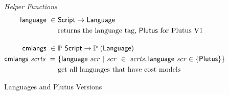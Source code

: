 \begin{figure*}[htb]
  \emph{Helper Functions}
  \begin{align*}
    \fun{language} ~\in~& \Script \to \Language \\
    &\text{returns the language tag, $\Plutus$ for Plutus V1}
    \nextdef
    \fun{cmlangs} ~\in~& \powerset{\Script} \to \powerset{(\Language)} \\
    \fun{cmlangs}~ \var{scrts} ~=~ & \{ \fun{language}~\var{scr} ~\vert~
      \var{scr}~\in~ \var{scrts}, \fun{language}~\var{scr} \in \{\Plutus\}  \}\\
    &\text{get all languages that have cost models}
  \end{align*}
  \caption{Languages and Plutus Versions}
  \label{fig:defs:functions-chain-helper}
\end{figure*}